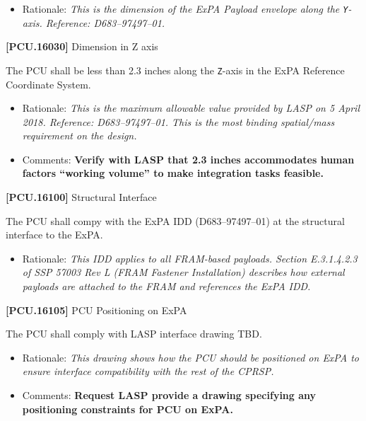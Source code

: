 \documentclass[12pt,oneside,oldfontcommands]{memoir}
\begin{document}
\begin{itemize}
\item{} Rationale: \emph{This is the dimension of the ExPA Payload envelope along the \texttt{Y}-axis. Reference: D683--97497--01.}

\end{itemize}

\textbf{[PCU.16030]} Dimension in Z axis

The \gls{PCU} shall be less than 2.3 inches along the \texttt{Z}-axis in the \gls{ExPA} Reference Coordinate System.

\begin{itemize}
\item{} Rationale: \emph{This is the maximum allowable value provided by LASP on 5 April 2018. Reference: D683--97497--01. This is the most binding spatial\slash mass requirement on the design.}

\item{} Comments: \textbf{Verify with LASP that 2.3 inches accommodates human factors ``working volume'' to make integration tasks feasible.}

\end{itemize}

\textbf{[PCU.16100]} Structural Interface

The \gls{PCU} shall compy with the \gls{ExPA} \gls{IDD} (D683--97497--01) at the structural interface to the \gls{ExPA}.

\begin{itemize}
\item{} Rationale: \emph{This IDD applies to all FRAM-based payloads. Section E.3.1.4.2.3 of SSP 57003 Rev L (FRAM Fastener Installation) describes how external payloads are attached to the FRAM and references the ExPA IDD.}

\end{itemize}

\textbf{[PCU.16105]} \gls{PCU} Positioning on \gls{ExPA}

The \gls{PCU} shall comply with \gls{LASP} interface drawing TBD\label{tbx_8}.

\begin{itemize}
\item{} Rationale: \emph{This drawing shows how the PCU should be positioned on ExPA to ensure interface compatibility with the rest of the CPRSP.}

\item{} Comments: \textbf{Request LASP provide a drawing specifying any positioning constraints for PCU on ExPA.}

\end{itemize}
\end{document}
